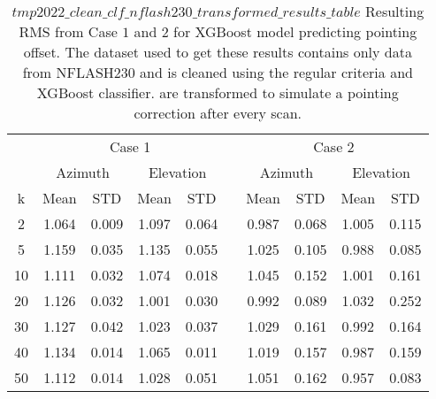\begin{table}[!htbp]
    \centering
    \caption{$tmp2022\_clean\_clf\_nflash230\_transformed\_results\_table$
    Resulting RMS from Case $1$ and $2$ for XGBoost model predicting pointing offset.
    The dataset used to get these results contains only data from NFLASH230 and is cleaned using the regular criteria and XGBoost classifier.
    are transformed to simulate a pointing correction after every scan.}
    \begin{tabular}{ccccc c cccc}
        \toprule
        \multicolumn{1}{c}{} & \multicolumn{4}{c}{Case 1} & & \multicolumn{4}{c}{Case 2} \\
        \cmidrule(lr){2-5} \cmidrule(lr){7-10}
        \multicolumn{1}{c}{} & \multicolumn{2}{c}{Azimuth} & \multicolumn{2}{c}{Elevation} & & \multicolumn{2}{c}{Azimuth} & \multicolumn{2}{c}{Elevation} \\ 
        \cmidrule(lr){2-5} \cmidrule(lr){7-10}
        k & Mean & STD & Mean & STD & & Mean & STD & Mean & STD \\ 
        \midrule
         2 &     1.064 &     0.009 &     1.097 &     0.064 &  &  0.987 &     0.068 &     1.005 &     0.115 \\
         5 &     1.159 &     0.035 &     1.135 &     0.055 &  &  1.025 &     0.105 &     0.988 &     0.085 \\
        10 &     1.111 &     0.032 &     1.074 &     0.018 &  &  1.045 &     0.152 &     1.001 &     0.161 \\
        20 &     1.126 &     0.032 &     1.001 &     0.030 &  &  0.992 &     0.089 &     1.032 &     0.252 \\
        30 &     1.127 &     0.042 &     1.023 &     0.037 &  &  1.029 &     0.161 &     0.992 &     0.164 \\
        40 &     1.134 &     0.014 &     1.065 &     0.011 &  &  1.019 &     0.157 &     0.987 &     0.159 \\
        50 &     1.112 &     0.014 &     1.028 &     0.051 &  &  1.051 &     0.162 &     0.957 &     0.083 \\
       \bottomrule
    \end{tabular}
\end{table}

